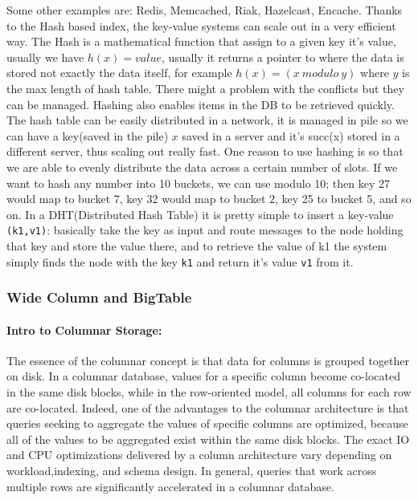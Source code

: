 \documentclass[a4page, 11pt]{article}
\begin{document}
Some other examples are: Redis, Memcached, Riak, Hazelcast, Encache.
\newline
Thanks to the Hash based index, the key-value systems can scale out in a very efficient way. 
The Hash is a mathematical function that assign to a given key it's value, usually we have $h(x) = value$, usually it returns a pointer to where the data is stored not exactly the data itself, for example $h(x) = (x\ modulo\ y)$ where $y$ is the max length of hash table. 
There might a problem with the conflicts but they can be managed. 
Hashing also enables items in the DB to be retrieved quickly. 
The hash table can be easily distributed in a network, it is managed in pile so we can have a key(saved in the pile) $x$ saved in a server and it's succ(x) stored in a different server, thus scaling out really fast. 
One reason to use hashing is so that we are able to
evenly distribute the data across a certain number of slots. If we want to hash any number into 10 buckets, we can use modulo 10; then key 27 would map to bucket 7, key 32 would map to bucket 2, key 25 to bucket 5, and so on.
\newline
In a DHT(Distributed Hash Table) it is pretty simple to insert a key-value \texttt{(k1,v1)}: basically take the key as input and route messages to the node holding that key and store the value there, and to retrieve the value of k1 the system simply finds the node with the key \texttt{k1} and return it's value \texttt{v1} from it.

\subsubsection{Wide Column and BigTable}
\paragraph{Intro to Columnar Storage:}%
The essence of the columnar concept is that data for columns is grouped together on disk. In a columnar database, values for a specific column become co-located in the same disk blocks, while in the row-oriented model, all columns for each row are co-located. Indeed, one of the advantages to the columnar architecture is that queries seeking to aggregate the values of specific columns are optimized, because all of the values to be aggregated exist within the same disk blocks. The exact IO and CPU optimizations delivered by a column architecture vary depending on workload,indexing, and schema design. In general, queries that work across multiple rows are significantly accelerated in a columnar database.\\
\end{document}
